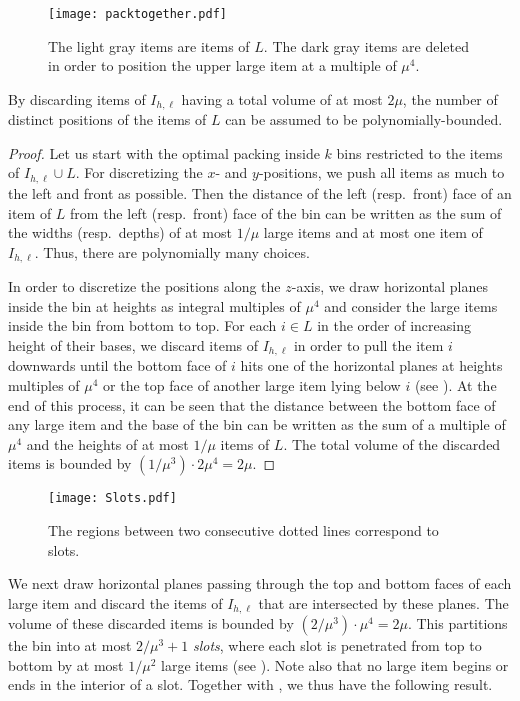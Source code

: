 \documentclass[a4paper,UKenglish,cleveref, autoref, thm-restate]{lipics-v2021}
\begin{document}
\begin{figure}
    \centering
    \texttt{[image: packtogether.pdf]}
    \caption{The light gray items are items of $L$. The dark gray items are deleted in order to position the upper large item at a multiple of $\mu^4$.}
    \label{fig:discretize}
    \end{figure}

\begin{lemma}
\label{lem:discretepos}
    By discarding items of $I_{h,\ell}$ having a total volume of at most $2\mu$, the number of distinct positions of the items of $L$ can be assumed to be polynomially-bounded. 
\end{lemma}
\begin{proof}
    Let us start with the optimal packing inside $k$ bins restricted to the items of $I_{h,\ell}\cup L$.
    For discretizing the $x$- and $y$-positions, we push all items as much to the left and front as possible. Then the distance of the left (resp.~front) face of an item of $L$ from the left (resp.~front) face of the bin can be written as the sum of the widths (resp.~depths) of at most $1/\mu$ large items and at most one item of $I_{h,\ell}$. Thus, there are polynomially many choices.

    In order to discretize the positions along the $z$-axis, we draw horizontal planes inside the bin at heights as integral multiples of $\mu^4$ and consider the large items inside the bin from bottom to top. For each $i \in L$ in the order of increasing height of their bases, we discard items of $I_{h,\ell}$ in order to pull the item $i$ downwards until the bottom face of $i$ hits one of the horizontal planes at heights multiples of $\mu^4$ or the top face of another large item lying below $i$ (see ). At the end of this process, it can be seen that the distance between the bottom face of any large item and the base of the bin can be written as the sum of a multiple of $\mu^4$ and the heights of at most $1/\mu$ items of $L$. The total volume of the discarded items is bounded by $(1/\mu^3)\cdot 2\mu^4 = 2\mu$.     
\end{proof}

\begin{figure}
    \centering
    \texttt{[image: Slots.pdf]}
    \caption{The regions between two consecutive dotted lines correspond to slots.}
    \label{fig:slots}
\end{figure}

We next draw horizontal planes passing through the top and bottom faces of each large item and discard the items of $I_{h,\ell}$ that are intersected by these planes. The volume of these discarded items is bounded by $(2/\mu^3)\cdot \mu^4 = 2\mu$. This partitions the bin into at most $2/\mu^3 +1$ \emph{slots}, where each slot is penetrated from top to bottom by at most $1/\mu^2$ large items (see ). Note also that no large item begins or ends in the interior of a slot. Together with , we thus have the following result.
\end{document}
